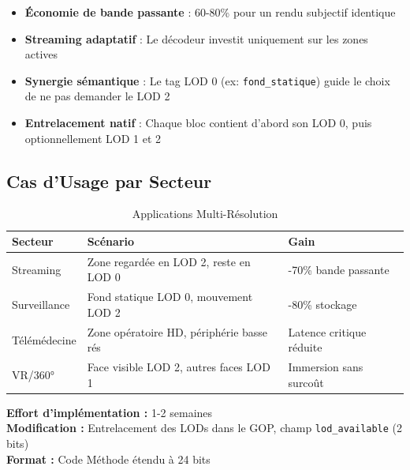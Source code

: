 \documentclass[12pt,a4paper]{article}
\begin{document}
	\begin{benefitbox}
		\begin{itemize}[leftmargin=*]
			\item \textbf{Économie de bande passante} : 60-80\% pour un rendu subjectif identique
			\item \textbf{Streaming adaptatif} : Le décodeur investit uniquement sur les zones actives
			\item \textbf{Synergie sémantique} : Le tag LOD 0 (ex: \texttt{fond\_statique}) guide le choix de ne pas demander le LOD 2
			\item \textbf{Entrelacement natif} : Chaque bloc contient d'abord son LOD 0, puis optionnellement LOD 1 et 2
		\end{itemize}
	\end{benefitbox}
	
	\subsection{Cas d'Usage par Secteur}
	
	\begin{table}[h]
		\centering
		\caption{Applications Multi-Résolution}
		\label{tab:multi_res}
		\begin{tabular}{@{}lll@{}}
			\toprule
			\textbf{Secteur} & \textbf{Scénario} & \textbf{Gain} \\ \midrule
			Streaming & Zone regardée en LOD 2, reste en LOD 0 & -70\% bande passante \\
			Surveillance & Fond statique LOD 0, mouvement LOD 2 & -80\% stockage \\
			Télémédecine & Zone opératoire HD, périphérie basse rés & Latence critique réduite \\
			VR/360° & Face visible LOD 2, autres faces LOD 1 & Immersion sans surcoût \\
			\bottomrule
		\end{tabular}
	\end{table}
	
	\begin{techbox}
		\textbf{Effort d'implémentation :} 1-2 semaines \\
		\textbf{Modification :} Entrelacement des LODs dans le GOP, champ \texttt{lod\_available} (2 bits) \\
		\textbf{Format :} Code Méthode étendu à 24 bits
	\end{techbox}
	
\end{document}
